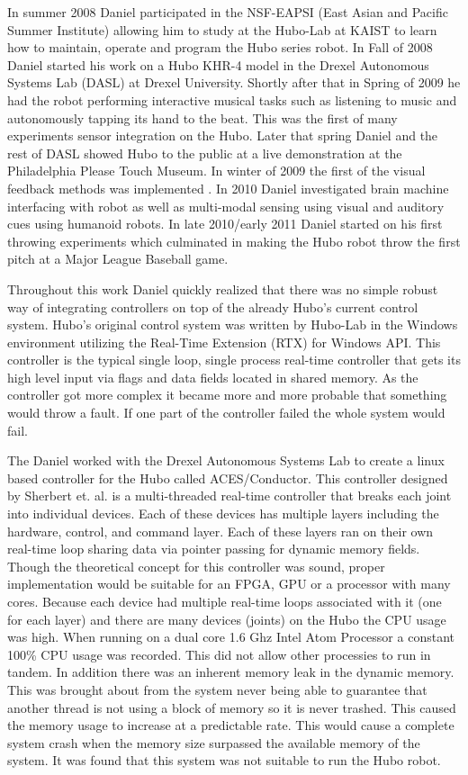 In summer 2008 Daniel participated in the NSF-EAPSI (East Asian and Pacific Summer Institute) allowing him to study at the Hubo-Lab at KAIST to learn how to maintain, operate and program the Hubo series robot.
In Fall of 2008 Daniel started his work on a Hubo KHR-4 model in the Drexel Autonomous Systems Lab (DASL) at Drexel University.
Shortly after that in Spring of 2009 he had the robot performing interactive musical tasks such as listening to music and autonomously tapping its hand to the beat\cite{5686847}.
This was the first of many experiments sensor integration on the Hubo.
Later that spring Daniel and the rest of DASL showed Hubo to the public at a live demonstration at the Philadelphia Please Touch Museum. 
In winter of 2009 the first of the visual feedback methods was implemented \cite{lofaroGamesRobot}.
In 2010 Daniel investigated brain machine interfacing with robot as well as multi-modal sensing using visual and auditory cues using humanoid robots.
In late 2010/early 2011 Daniel started on his first throwing experiments which culminated in making the Hubo robot throw the first pitch at a Major League Baseball game.

Throughout this work Daniel quickly realized that there was no simple robust way of integrating controllers on top of the already Hubo's current control system.
Hubo's original control system was written by Hubo-Lab in the Windows environment utilizing the Real-Time Extension (RTX) for Windows API.
This controller is the typical single loop, single process real-time controller that gets its high level input via flags and data fields located in shared memory.
As the controller got more complex it became more and more probable that something would throw a fault.  
If one part of the controller failed the whole system would fail.

The Daniel worked with the Drexel Autonomous Systems Lab to create a linux based controller for the Hubo called ACES/Conductor.
This controller designed by Sherbert et. al. \cite{aces} is a multi-threaded real-time controller that breaks each joint into individual devices. 
Each of these devices has multiple layers including the hardware, control, and command layer.
Each of these layers ran on their own real-time loop sharing data via pointer passing for dynamic memory fields.
Though the theoretical concept for this controller was sound, proper implementation would be suitable for an FPGA, GPU or a processor with many cores.
Because each device had multiple real-time loops associated with it (one for each layer) and there are many devices (joints) on the Hubo the CPU usage was high.
When running on a dual core 1.6 Ghz Intel Atom Processor a constant 100\% CPU usage was recorded.
This did not allow other processies to run in tandem.
In addition there was an inherent memory leak in the dynamic memory.
This was brought about from the system never being able to guarantee that another thread is not using a block of memory so it is never trashed.
This caused the memory usage to increase at a predictable rate.
This would cause a complete system crash when the memory size surpassed the available memory of the system.
It was found that this system was not suitable to run the Hubo robot.

